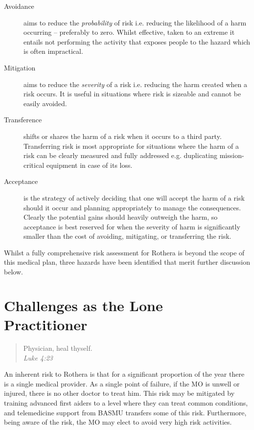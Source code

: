 \documentclass[12pt,a4paper]{article}
\begin{document}
\begin{description}
    \item[Avoidance] aims to reduce the \emph{probability} of risk i.e. reducing the likelihood of a harm occurring -- preferably to zero. Whilst effective, taken to an extreme it entails not performing the activity that exposes people to the hazard which is often impractical.
    \item[Mitigation] aims to reduce the \emph{severity} of a risk i.e. reducing the harm created when a risk occurs. It is useful in situations where risk is sizeable and cannot be easily avoided.
    \item[Transference] shifts or shares the harm of a risk when it occurs to a third party. Transferring risk is most appropriate for situations where the harm of a risk can be clearly measured and fully addressed e.g. duplicating mission-critical equipment in case of its loss.
    \item[Acceptance] is the strategy of actively deciding that one will accept the harm of a risk should it occur and planning appropriately to manage the consequences. Clearly the potential gains should heavily outweigh the harm, so acceptance is best reserved for when the severity of harm is significantly smaller than the cost of avoiding, mitigating, or transferring the risk.
\end{description}

Whilst a fully comprehensive risk assessment for Rothera is beyond the scope of this medical plan, three hazards have been identified that merit further discussion below.

\section{Challenges as the Lone Practitioner}

\begin{quote}
Physician, heal thyself. \\
\em Luke 4:23
\end{quote}

An inherent risk to Rothera is that for a significant proportion of the year there is a single medical provider. As a single point of failure, if the MO is unwell or injured, there is no other doctor to treat him. This risk may be mitigated by training advanced first aiders to a level where they can treat common conditions, and telemedicine support from BASMU transfers some of this risk. Furthermore, being aware of the risk, the MO may elect to avoid very high risk activities.
\end{document}
